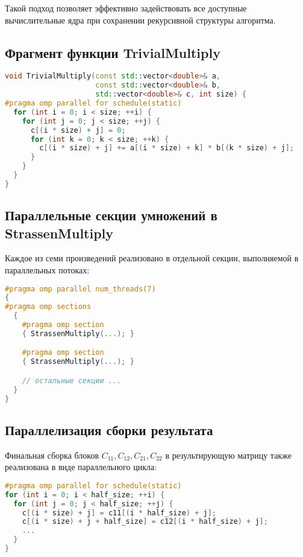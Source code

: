 \documentclass[14pt,a4paper]{extarticle}
\begin{document}
Такой подход позволяет эффективно задействовать все доступные вычислительные ядра при сохранении рекурсивной структуры алгоритма.

\subsection*{Фрагмент функции TrivialMultiply}

\begin{lstlisting}[language=C++]
void TrivialMultiply(const std::vector<double>& a,
                     const std::vector<double>& b,
                     std::vector<double>& c, int size) {
#pragma omp parallel for schedule(static)
  for (int i = 0; i < size; ++i) {
    for (int j = 0; j < size; ++j) {
      c[(i * size) + j] = 0;
      for (int k = 0; k < size; ++k) {
        c[(i * size) + j] += a[(i * size) + k] * b[(k * size) + j];
      }
    }
  }
}
\end{lstlisting}

\subsection*{Параллельные секции умножений в StrassenMultiply}

Каждое из семи произведений реализовано в отдельной секции, выполняемой в параллельных потоках:

\begin{lstlisting}[language=C++]
#pragma omp parallel num_threads(7)
{
#pragma omp sections
  {
    #pragma omp section
    { StrassenMultiply(...); }

    #pragma omp section
    { StrassenMultiply(...); }

    // остальные секции ...
  }
}
\end{lstlisting}

\subsection*{Параллелизация сборки результата}

Финальная сборка блоков $C_{11}, C_{12}, C_{21}, C_{22}$ в результирующую матрицу также реализована в виде параллельного цикла:

\begin{lstlisting}[language=C++]
#pragma omp parallel for schedule(static)
for (int i = 0; i < half_size; ++i) {
  for (int j = 0; j < half_size; ++j) {
    c[(i * size) + j] = c11[(i * half_size) + j];
    c[(i * size) + j + half_size] = c12[(i * half_size) + j];
    ...
  }
}
\end{lstlisting}
\end{document}
